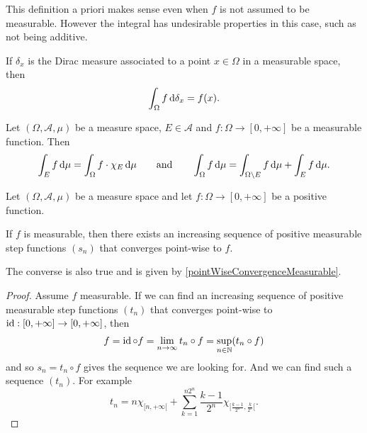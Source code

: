 This definition a priori makes sense even when $f$ is not assumed to be measurable. However the integral has undesirable properties in this case, such as not being additive.

\begin{example}
If $\delta_x$ is the Dirac measure associated to a point $x\in\Omega$ in a measurable space, then
\[ \int_\Omega f \operatorname{d \!}{\delta_x} = f(x). \]
\end{example}

\begin{lemma} \label{integralOverSubset}
Let $(\Omega, \mathcal{A}, \mu)$ be a measure space, $E\in\mathcal{A}$ and $f:\Omega\to[0,+\infty]$ be a measurable function. Then
\[ \int_E f \operatorname{d \!}{\mu} = \int_\Omega f\cdot\chi_{E} \operatorname{d \!}{\mu} \qquad\text{and}\qquad \int_\Omega f\operatorname{d \!}{\mu} = \int_{\Omega\setminus E} f\operatorname{d \!}{\mu}+\int_E f\operatorname{d \!}{\mu}. \]
\end{lemma}

\begin{proposition}
Let $(\Omega, \mathcal{A}, \mu)$ be a measure space and let $f:\Omega\to[0,+\infty]$ be a positive function.

If $f$ is measurable, then there exists an increasing sequence of positive measurable step functions $(s_n)$ that converges point-wise to $f$.
\end{proposition}
The converse is also true and is given by \ref{pointWiseConvergenceMeasurable}.
\begin{proof}
Assume $f$ measurable. If we can find an increasing sequence of positive measurable step functions $(t_n)$ that converges point-wise to $\operatorname{id}:[0,+\infty]\to[0,+\infty]$, then
\[ f = \operatorname{id}\circ f = \lim_{n\to\infty} t_n\circ f = \sup_{n\in\mathbb{N}}(t_n\circ f) \]
and so $s_n = t_n\circ f$ gives the sequence we are looking for. And we can find such a sequence $(t_n)$. For example
\[ t_n = n\chi_{[n,+\infty[}+\sum_{k=1}^{n2^n}\frac{k-1}{2^n}\chi_{[\frac{k-1}{2^n},\frac{k}{2^n}[}. \]
\end{proof}

